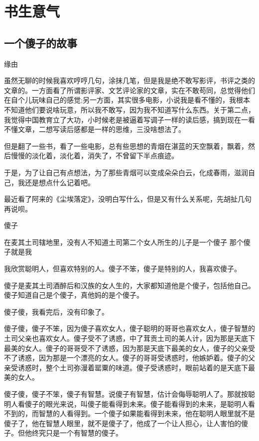 \chapter{书生意气}
\section*{一个傻子的故事}

缘由

虽然无聊的时候我喜欢哼哼几句，涂抹几笔，但是我是绝不敢写影评，书评之类的文章的。一方面看了所谓影评家、文艺评论家的文章，实在不敢苟同，总觉得他们在自个儿玩味自己的感觉;另一方面，其实很多电影，小说我是看不懂的，我根本不知道他们要说啥玩意，所以我不敢写，因为我不知道写什么东西。关于第二点，我觉得中国教育立了大功，小时候老是被逼着写调子一样的读后感，搞到现在一看不懂文章，二想写读后感都是一样的思维，三没啥想法了。

但是翻了一些书，看了一些电影，总有些思想的青烟在湛蓝的天空飘着，飘着，然后慢慢的淡化着，淡化着，消失了，不曾留下半点痕迹。

于是，为了让自己有点想法，为了那些青烟可以变成朵朵白云，化成春雨，滋润自己，我还是想点什么记着吧。

最近看了阿来的《尘埃落定》，没明白写什么，但是又有什么关系呢，先胡扯几句再说呗。

傻子

在麦其土司辖地里，没有人不知道土司第二个女人所生的儿子是一个傻子
那个傻子就是我

我欣赏聪明人，但喜欢特别的人。傻子不笨，傻子是特别的人，我喜欢傻子。

傻子是麦其土司酒醉后和汉族的女人生的，大家都知道他是个傻子，包括他自己。傻子知道自己是个傻子，真他妈的是个傻子。

傻子傻，我看完后，没有印象了。

傻子傻，傻子不笨，因为傻子喜欢女人，傻子聪明的哥哥也喜欢女人，傻子智慧的土司父亲也喜欢女人。傻子受不了诱惑，中了茸贡土司的美人计，因为那是天底下最美的女人。傻子的哥哥受不了诱惑，因为那是天底下最美的女人，傻子的父亲受不了诱惑，因为那是一个漂亮的女人。傻子的哥哥受诱惑时，他嫉妒着。傻子的父亲受诱惑时，整个土司弥漫着罂粟的味道。傻子受诱惑时，眼前站着的是天底下最美的女人。

傻子傻，傻子不笨，傻子有智慧。说傻子有智慧，估计会侮辱聪明人了。那就按聪明人看傻子的眼光来说，叫傻子能看得到未来。傻子能看得到的未来，是聪明人看不到的，而智慧的人看得到。一个傻子如果能看得到未来，他在聪明人眼里就不是傻子了，他在智慧人眼里，就不是傻子了，他成了一个让人担心，让人害怕的傻子。但他终究只是一个有智慧的傻子。

